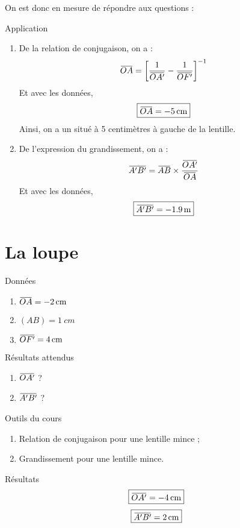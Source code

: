 \documentclass[10pt,a5paper,notitlepage]{book}
\begin{document}
On est donc en mesure de répondre aux questions :

\begin{NCexem}{Application}
    \begin{enumerate}
        \item De la relation de conjugaison, on a :
            \[\OA = \left[ \frac{1}{\OAp} - \frac{1}{\OF} \right]^{-1}\]
            Et avec les données,
            \[ \boxed{\OA = \SI{- 5}{cm}}\]
            Ainsi, on a un  situé à 5 centimètres à gauche de
            la lentille.

        \item De l'expression du grandissement, on a :
            \[\ABp = \ABb\times\frac{\OAp}{\OA}\]
            Et avec les données,
            \[ \boxed{\ABp = \SI{- 1.9}{m}} \]
    \end{enumerate}
\end{NCexem}

\section{La loupe}
\begin{NCdefi}{Données}
    \begin{enumerate}
        \item $\OA = \SI{-2}{cm}$
        \item $(AB) = \SI{1}{cm}$
        \item $\OF = \SI{4}{cm}$
    \end{enumerate}
\end{NCdefi}

\begin{NCprop}{Résultats attendus}
    \begin{enumerate}
        \item $\OAp$ ?
        \item $\ABp$ ?
    \end{enumerate}
\end{NCprop}

\begin{NCdemo}{Outils du cours}
   \begin{enumerate}
       \item Relation de conjugaison pour une lentille mince ;
       \item Grandissement pour une lentille mince.
   \end{enumerate} 
\end{NCdemo}

\begin{NCexem}{Résultats}
    \[ \boxed{\OAp = \SI{-4}{cm}} \]
    \[ \boxed{\ABp = \SI{2}{cm}} \]
\end{NCexem}
\end{document}
